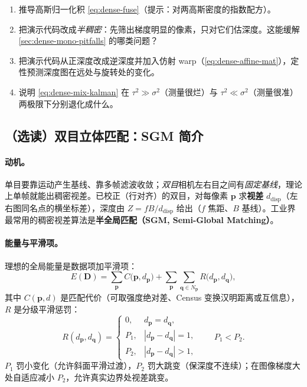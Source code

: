 \begin{practice}[练习]
\begin{enumerate}
  \item 推导高斯归一化积 \cref{eq:dense-fuse}（提示：对两高斯密度的指数配方）。
  \item 把演示代码改成\emph{半稠密}：先筛出梯度明显的像素，只对它们估深度。这能缓解 \cref{sec:dense-mono-pitfalls} 的哪类问题？
  \item 把演示代码从正深度改成逆深度并加入仿射 warp（\cref{eq:dense-affine-mat}），定性预测深度图在远处与旋转处的变化。
  \item 说明 \cref{eq:dense-mix-kalman} 在 $\tau^2\gg\sigma^2$（测量很烂）与 $\tau^2\ll\sigma^2$（测量很准）两极限下分别退化成什么。
\end{enumerate}
\end{practice}

\subsection{（选读）双目立体匹配：SGM 简介}
\label{sec:dense-sgm}

\paragraph{动机。}
单目要靠运动产生基线、靠多帧滤波收敛；\emph{双目}相机左右目之间有\emph{固定基线}，理论上单帧就能出稠密视差。已校正（行对齐）的双目，对每像素 $\mathbf{p}$ 求\textbf{视差} $d_{\mathrm{disp}}$（左右图同名点的横坐标差），深度由 $Z=fB/d_{\mathrm{disp}}$ 给出（$f$ 焦距、$B$ 基线）。工业界最常用的稠密视差算法是\textbf{半全局匹配（SGM, Semi-Global Matching）}\cite{hirschmuller2008sgm}。

\paragraph{能量与平滑项。}
理想的全局能量是数据项加平滑项：
\begin{equation}
  E(\mathbf{D})=\sum_{\mathbf{p}}C\!\bigl(\mathbf{p},d_{\mathbf{p}}\bigr)
   +\sum_{\mathbf{p}}\sum_{\mathbf{q}\in N_{\mathbf{p}}}R\!\bigl(d_{\mathbf{p}},d_{\mathbf{q}}\bigr),
  \label{eq:dense-sgm-energy}
\end{equation}
其中 $C(\mathbf{p},d)$ 是匹配代价（可取强度绝对差、Census 变换汉明距离或互信息），$R$ 是分级平滑惩罚：
\begin{equation}
  R(d_{\mathbf{p}},d_{\mathbf{q}})=\begin{cases}0,&d_{\mathbf{p}}=d_{\mathbf{q}},\\ P_1,&|d_{\mathbf{p}}-d_{\mathbf{q}}|=1,\\ P_2,&|d_{\mathbf{p}}-d_{\mathbf{q}}|>1,\end{cases}
  \qquad P_1<P_2.
  \label{eq:dense-sgm-smooth}
\end{equation}
$P_1$ 罚小变化（允许斜面平滑过渡），$P_2$ 罚大跳变（保深度不连续）；在图像梯度大处自适应减小 $P_2$，允许真实边界处视差跳变。

